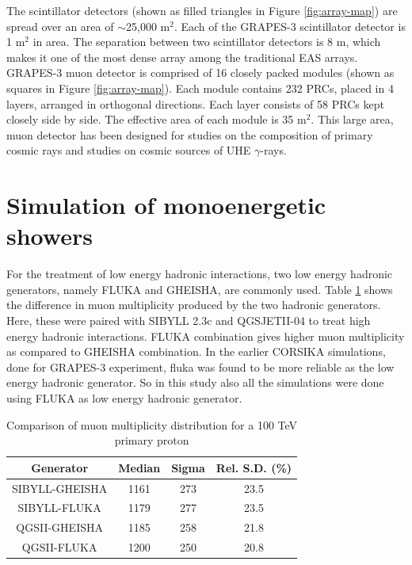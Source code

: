 \documentclass[12pt]{article}
\begin{document}
The scintillator detectors (shown as filled triangles in Figure \ref{fig:array-map}) are spread over an area of $\sim$25,000 m$^2$. Each of the GRAPES-3 scintillator detector is 1 m$^2$ in area. The separation between two scintillator detectors is 8 m, which makes it one of the most dense array among the traditional EAS arrays. GRAPES-3 muon detector is comprised of 16 closely packed modules (shown as squares in Figure \ref{fig:array-map}). Each module contains 232 PRCs, placed in 4 layers, arranged in orthogonal directions. Each layer consists of 58 PRCs kept closely side by side. The effective area of each module is 35 m$^2$. This large area, muon detector has been designed for studies on the composition of primary cosmic rays and studies on cosmic sources of UHE $\gamma$-rays. 


\section{Simulation of monoenergetic showers}

For the treatment of low energy hadronic interactions, two low energy hadronic generators, namely FLUKA and GHEISHA, are commonly used. Table \ref{tab:fluka-gheisha} shows the difference in muon multiplicity produced by the two hadronic generators. Here, these were paired with SIBYLL 2.3c and QGSJETII-04 to treat high energy hadronic interactions. FLUKA combination gives higher muon multiplicity as compared to GHEISHA combination. In the earlier CORSIKA simulations, done for GRAPES-3 experiment, fluka was found to be more reliable as the low energy hadronic generator. So in this study also all the simulations were done using FLUKA as low energy hadronic generator. 

\begin{table}
\centering
\begin{tabular}{ | c | c | c | c |} 
\hline
Generator & Median & Sigma & Rel. S.D. (\%) \\ 
\hline
SIBYLL-GHEISHA &1161 & 273 & 23.5  \\ 
\hline
SIBYLL-FLUKA   & 1179 & 277 & 23.5  \\
\hline
QGSII-GHEISHA  & 1185 & 258 & 21.8  \\
\hline
QGSII-FLUKA  & 1200 & 250 & 20.8 \\
\hline
\end{tabular}
\caption{Comparison of muon  multiplicity distribution for a 100 TeV primary proton}
\label{tab:fluka-gheisha}
\end{table}
\end{document}
